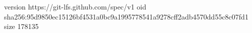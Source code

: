 version https://git-lfs.github.com/spec/v1
oid sha256:95d9850ec15126bf4531a0bc9a1995778541a9278cff2adb4570dd55c8c07fd1
size 178135
